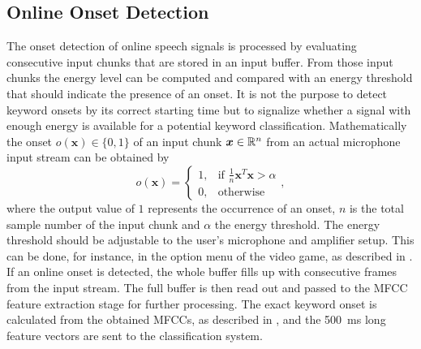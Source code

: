 
\subsection{Online Onset Detection}\label{sec:signal_onset_online}
The onset detection of online speech signals is processed by evaluating consecutive input chunks that are stored in an input buffer.
From those input chunks the energy level can be computed and compared with an energy threshold that should indicate the presence of an onset.
It is not the purpose to detect keyword onsets by its correct starting time but to signalize whether a signal with enough energy is available for a potential keyword classification.
Mathematically the onset $o(\bm{x}) \in \{0, 1\}$ of an input chunk $\bm{x} \in \mathbb{R}^n$ from an actual microphone input stream can be obtained by
\begin{equation}
  o(\bm{x}) = 
  \begin{cases}
    1, & \text{if } \frac{1}{n} \bm{x}^T \bm{x} > \alpha\\
    0, & \text{otherwise} 
  \end{cases},
\end{equation}
where the output value of $1$ represents the occurrence of an onset, $n$ is the total sample number of the input chunk and $\alpha$ the energy threshold.
The energy threshold should be adjustable to the user's microphone and amplifier setup. 
This can be done, for instance, in the option menu of the video game, as described in .
If an online onset is detected, the whole buffer fills up with consecutive frames from the input stream.
The full buffer is then read out and passed to the MFCC feature extraction stage for further processing.
The exact keyword onset is calculated from the obtained MFCCs, as described in , and the \SI{500}{\milli\second} long feature vectors are sent to the classification system.